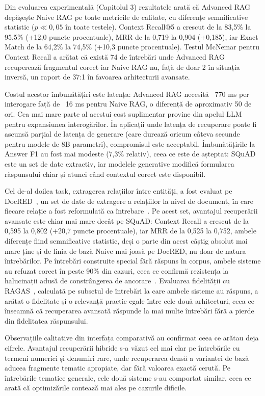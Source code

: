 Din evaluarea experimentală (Capitolul 3) rezultatele arată că Advanced RAG depășește Naive RAG pe toate metricile de calitate, cu diferențe semnificative statistic ($p \ll 0{,}05$ în toate testele). Context Recall@5 a crescut de la 83,5\% la 95,5\% (+12,0 puncte procentuale), MRR de la 0,719 la 0,904 (+0,185), iar Exact Match de la 64,2\% la 74,5\% (+10,3 puncte procentuale). Testul McNemar pentru Context Recall a arătat că există 74 de întrebări unde Advanced RAG recuperează fragmentul corect iar Naive RAG nu, față de doar 2 în situația inversă, un raport de 37:1 în favoarea arhitecturii avansate.

Costul acestor îmbunătățiri este latența: Advanced RAG necesită ~770 ms per interogare față de ~16 ms pentru Naive RAG, o diferență de aproximativ 50 de ori. Cea mai mare parte al acestui cost suplimentar provine din apelul LLM pentru expansiunea interogărilor. În aplicații unde latența de recuperare poate fi ascunsă parțial de latența de generare (care durează oricum câteva secunde pentru modele de 8B parametri), compromisul este acceptabil. Îmbunătățirile la Answer F1 au fost mai modeste (7,3\% relativ), ceea ce este de așteptat: SQuAD este un set de date extractiv, iar modelele generative modifică formularea răspunsului chiar și atunci când contextul corect este disponibil.

Cel de-al doilea task, extragerea relațiilor între entități, a fost evaluat pe DocRED~\cite{yao2019docred}, un set de date de extragere a relațiilor la nivel de document, în care fiecare relație a fost reformulată ca întrebare~\cite{levy2017zeroshot}. Pe acest set, avantajul recuperării avansate este chiar mai mare decât pe SQuAD: Context Recall a crescut de la 0,595 la 0,802 (+20,7 puncte procentuale), iar MRR de la 0,525 la 0,752, ambele diferențe fiind semnificative statistic, deși o parte din acest câștig absolut mai mare ține și de linia de bază Naive mai joasă pe DocRED, nu doar de natura întrebărilor. Pe întrebări construite special fără răspuns în corpus, ambele sisteme au refuzat corect în peste 90\% din cazuri, ceea ce confirmă rezistența la halucinații adusă de constrângerea de ancorare~\cite{asai2023self}. Evaluarea fidelității cu RAGAS~\cite{es2024ragas}, calculată pe subsetul de întrebări la care ambele sisteme au răspuns, a arătat o fidelitate și o relevanță practic egale între cele două arhitecturi, ceea ce înseamnă că recuperarea avansată răspunde la mai multe întrebări fără a pierde din fidelitatea răspunsului.

Observațiile calitative din interfața comparativă au confirmat ceea ce arătau deja cifrele. Avantajul recuperării hibride s-a văzut cel mai clar pe întrebările cu termeni numerici și denumiri rare, unde recuperarea densă a variantei de bază aducea fragmente tematic apropiate, dar fără valoarea exactă cerută. Pe întrebările tematice generale, cele două sisteme s-au comportat similar, ceea ce arată că optimizările contează mai ales pe cazurile dificile.

